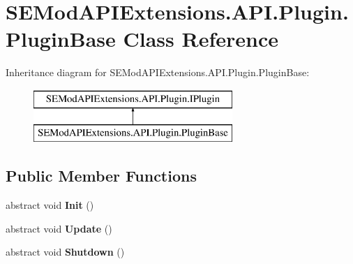 \hypertarget{class_s_e_mod_a_p_i_extensions_1_1_a_p_i_1_1_plugin_1_1_plugin_base}{}\section{S\+E\+Mod\+A\+P\+I\+Extensions.\+A\+P\+I.\+Plugin.\+Plugin\+Base Class Reference}
\label{class_s_e_mod_a_p_i_extensions_1_1_a_p_i_1_1_plugin_1_1_plugin_base}
Inheritance diagram for S\+E\+Mod\+A\+P\+I\+Extensions.\+A\+P\+I.\+Plugin.\+Plugin\+Base\+:\begin{figure}[H]
\begin{center}
\leavevmode
\includegraphics[height=2.000000cm]{class_s_e_mod_a_p_i_extensions_1_1_a_p_i_1_1_plugin_1_1_plugin_base}
\end{center}
\end{figure}
\subsection*{Public Member Functions}
\begin{DoxyCompactItemize}
\item 
\hypertarget{class_s_e_mod_a_p_i_extensions_1_1_a_p_i_1_1_plugin_1_1_plugin_base_a6a9cb0b1d10befea89a6e9cc99b14e72}{}abstract void {\bfseries Init} ()\label{class_s_e_mod_a_p_i_extensions_1_1_a_p_i_1_1_plugin_1_1_plugin_base_a6a9cb0b1d10befea89a6e9cc99b14e72}

\item 
\hypertarget{class_s_e_mod_a_p_i_extensions_1_1_a_p_i_1_1_plugin_1_1_plugin_base_a165742be590b2135a072505cadf613e7}{}abstract void {\bfseries Update} ()\label{class_s_e_mod_a_p_i_extensions_1_1_a_p_i_1_1_plugin_1_1_plugin_base_a165742be590b2135a072505cadf613e7}

\item 
\hypertarget{class_s_e_mod_a_p_i_extensions_1_1_a_p_i_1_1_plugin_1_1_plugin_base_a4a84a753570c89c4277fd9606ce577d6}{}abstract void {\bfseries Shutdown} ()\label{class_s_e_mod_a_p_i_extensions_1_1_a_p_i_1_1_plugin_1_1_plugin_base_a4a84a753570c89c4277fd9606ce577d6}

\end{DoxyCompactItemize}

